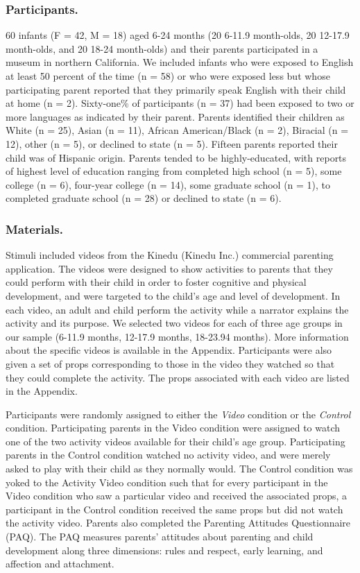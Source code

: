 \documentclass[10pt, letterpaper]{article}
\begin{document}
\subsubsection{Participants.}\label{participants.}

60 infants (F = 42, M = 18) aged 6-24 months (20 6-11.9 month-olds, 20
12-17.9 month-olds, and 20 18-24 month-olds) and their parents
participated in a museum in northern California. We included infants who
were exposed to English at least 50 percent of the time (n = 58) or who
were exposed less but whose participating parent reported that they
primarily speak English with their child at home (n = 2). Sixty-one\% of
participants (n = 37) had been exposed to two or more languages as
indicated by their parent. Parents identified their children as White (n
= 25), Asian (n = 11), African American/Black (n = 2), Biracial (n =
12), other (n = 5), or declined to state (n = 5). Fifteen parents
reported their child was of Hispanic origin. Parents tended to be
highly-educated, with reports of highest level of education ranging from
completed high school (n = 5), some college (n = 6), four-year college
(n = 14), some graduate school (n = 1), to completed graduate school (n
= 28) or declined to state (n = 6).

\subsubsection{Materials.}\label{materials.}

Stimuli included videos from the Kinedu (Kinedu Inc.) commercial
parenting application. The videos were designed to show activities to
parents that they could perform with their child in order to foster
cognitive and physical development, and were targeted to the child's age
and level of development. In each video, an adult and child perform the
activity while a narrator explains the activity and its purpose. We
selected two videos for each of three age groups in our sample (6-11.9
months, 12-17.9 months, 18-23.94 months). More information about the
specific videos is available in the Appendix. Participants were also
given a set of props corresponding to those in the video they watched so
that they could complete the activity. The props associated with each
video are listed in the Appendix.

Participants were randomly assigned to either the \emph{Video} condition
or the \emph{Control} condition. Participating parents in the Video
condition were assigned to watch one of the two activity videos
available for their child's age group. Participating parents in the
Control condition watched no activity video, and were merely asked to
play with their child as they normally would. The Control condition was
yoked to the Activity Video condition such that for every participant in
the Video condition who saw a particular video and received the
associated props, a participant in the Control condition received the
same props but did not watch the activity video. Parents also completed
the Parenting Attitudes Questionnaire (PAQ). The PAQ measures parents'
attitudes about parenting and child development along three dimensions:
rules and respect, early learning, and affection and attachment.
\end{document}
